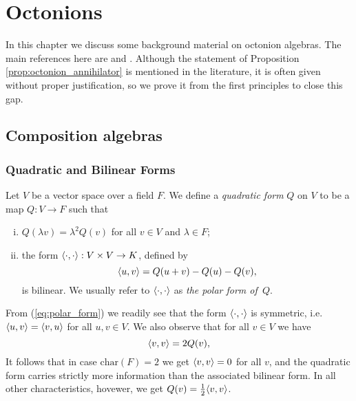 \chapter{Octonions}
\label{chapter1}


In this chapter we discuss some background 
material on octonion algebras. The main 
references here are \cite{SpringerVeldkamp}
and \cite{Schafer}. Although the statement
of Proposition \ref{prop:octonion_annihilator}
is mentioned in the literature, it is often
given without proper justification, so we
prove it from the first principles to close 
this gap.


\section{Composition algebras}

\subsection{Quadratic and Bilinear Forms}

Let $V$ be a vector space over a field $F$. We define a \textit{quadratic form}
$Q$ on $V$ to be a map $Q : V \rightarrow F$ such that
\begin{enumerate}[(i)]
\item $Q(\lambda v) = \lambda^2 Q(v)$ for all $v \in V$ and
  $\lambda \in F$;

\item the form $\langle \cdot, \cdot \rangle: V\times V \rightarrow K$,
  defined by
  \begin{equation}
  	\label{eq:polar_form}
    \langle u, v \rangle = Q(u+v) - Q(u) - Q(v),
  \end{equation}
  is bilinear. We usually refer to $\langle \cdot, \cdot \rangle$ as 
  \textit{the polar form of\ $Q$}. 
\end{enumerate}
From (\ref{eq:polar_form}) we readily see that the form $\langle \cdot, \cdot \rangle$ is symmetric,
i.e. $\langle u, v \rangle = \langle v, u \rangle$ for all $u,v \in V$. We also observe that for all 
$v \in V$ we have
\begin{equation}
	\langle v, v \rangle = 2Q(v),
\end{equation}
It follows that in case $\mathrm{char}(F) = 2$ we get $\langle v, v \rangle = 0$ for all $v$, and 
the quadratic form
carries strictly more information than the associated bilinear form. In all other characteristics,
hovewer, we get $Q(v) = \frac12 \langle v, v \rangle$. 

